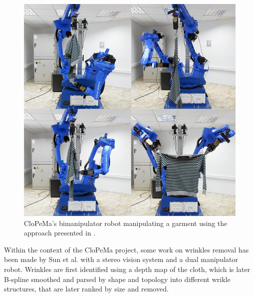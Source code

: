 \begin{figure}[thpb]
    \centering
    \includegraphics[width=0.98
    \textwidth]{figures/SOTA_Doumanoglou_2014.png}
    \caption[CloPeMa's bimanipulator robot manipulating a garment using the approach presented by Doumanoglou et al.]
    {CloPeMa's bimanipulator robot manipulating a garment using the approach presented in \cite{Doumanoglou2014ECCV}.}
    \label{fig:SOTA_Doumanoglou_2014}
\end{figure}


Within the context of the CloPeMa project, some work on wrinkles removal has been made by Sun et al. \cite{Sun2015} with a stereo vision system and a dual manipulator robot. Wrinkles are first identified  using a depth map of the cloth, which is later B-spline smoothed and parsed by shape and topology into different wrikle structures, that are later ranked by size and removed.
